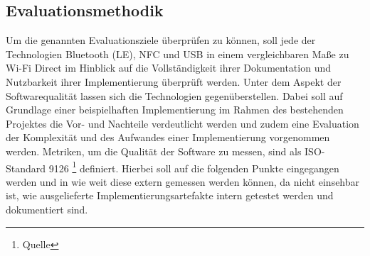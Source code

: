     \subsection{Evaluationsmethodik}
    	Um die genannten Evaluationsziele überprüfen zu können, soll jede der Technologien Bluetooth (LE), NFC und USB in einem vergleichbaren Maße zu Wi-Fi Direct im Hinblick auf die Vollständigkeit ihrer Dokumentation und Nutzbarkeit ihrer Implementierung überprüft werden.
    	Unter dem Aspekt der Softwarequalität lassen sich die Technologien gegenüberstellen. Dabei soll auf Grundlage einer beispielhaften Implementierung im Rahmen des bestehenden Projektes die Vor- und Nachteile verdeutlicht werden und zudem eine Evaluation der Komplexität und des Aufwandes einer Implementierung vorgenommen werden. Metriken, um die Qualität der Software zu messen, sind als ISO-Standard 9126 \footnote{Quelle} definiert. Hierbei soll auf die folgenden Punkte eingegangen werden und in wie weit diese extern gemessen werden können, da nicht einsehbar ist, wie ausgelieferte Implementierungsartefakte intern getestet werden und dokumentiert sind.
